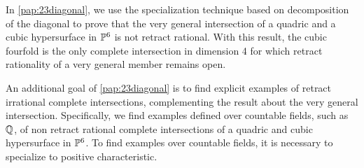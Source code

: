 In \cref{pap:23diagonal}, we use the specialization technique based on decomposition of the diagonal to prove that the very general intersection of a quadric and a cubic hypersurface in $\P^6$ is not retract rational. With this result, the cubic fourfold is the only complete intersection in dimension 4
for which retract rationality of a very general member remains open.

 An additional goal of \cref{pap:23diagonal} is to find explicit examples of retract irrational complete intersections, complementing the result about the very general intersection. Specifically, we find examples defined over countable fields, such as $\Q$, of non retract rational complete intersections of a quadric and cubic hypersurface in $\P^6$. To find examples over countable fields, it is necessary to specialize to positive characteristic.

